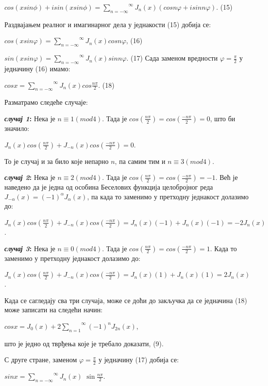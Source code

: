 \(cos(xsin\phi) + isin(xsin\phi) = \overset{\infty}{\sum_{n = - \infty}}J_{n}(x)(cosn\varphi + isinn\varphi)\).
(15)

Раздвајањем реалног и имагинарног дела у једнакости (15) добија се:

\(cos(xsin\varphi) = \overset{\infty}{\sum_{n = - \infty}}J_{n}(x)cosn\varphi\),
(16)

\(sin(xsin\varphi) = \overset{\infty}{\sum_{n = - \infty}}J_{n}(x)sinn\varphi\).
(17) Сада заменом вредности \(\varphi = \frac{\pi}{2}\) у једначину (16)
имамо:

\(cosx = \overset{\infty}{\sum_{n = - \infty}}J_{n}(x)cos\frac{n\pi}{2}\).
(18)

Разматрамо следеће случаје:

\textbf{\emph{случај 1}:} Нека је \(n \equiv 1(mod4)\). Тада је
\(cos(\frac{n\pi}{2}) = cos(\frac{- n\pi}{2}) = 0\), што би значило:

\(J_{n}(x)cos(\frac{n\pi}{2}) + J_{- n}(x)cos(\frac{- n\pi}{2}) = 0\).

То је случај и за било које непарно \(n\), па самим тим и
\(n \equiv 3(mod4)\).

\textbf{\emph{случај 2}:} Нека је \(n \equiv 2(mod4)\). Тада је
\(cos(\frac{n\pi}{2}) = cos(\frac{- n\pi}{2}) = - 1\). Већ је наведено
да је једна од особина Беселових функција целобројног реда
\(J_{- \alpha}(x) = {( - 1)}^{\alpha}J_{\alpha}(x)\), па када то
заменимо у претходну једнакост долазимо до:

\(J_{n}(x)cos(\frac{n\pi}{2}) + J_{- n}(x)cos(\frac{- n\pi}{2}) = J_{n}(x)( - 1) + J_{n}(x)( - 1) = - 2J_{n}(x)\).

\textbf{\emph{случај 3}:} Нека је \(n \equiv 0(mod4)\). Тада је
\(cos(\frac{n\pi}{2}) = cos(\frac{- n\pi}{2}) = 1\). Када то заменимо у
претходну једнакост долазимо до:

\(J_{n}(x)cos(\frac{n\pi}{2}) + J_{- n}(x)cos(\frac{- n\pi}{2}) = J_{n}(x)(1) + J_{n}(x)(1) = 2J_{n}(x)\).

Када се сагледају сва три случаја, може се доћи до закључка да се
једначина (18) може записати на следећи начин:

\(cosx = J_{0}(x) + 2\overset{\infty}{\sum_{n = 1}}{( - 1)}^{n}J_{2n}(x)\),

што је једно од тврђења које је требало доказати, (9).

С друге стране, заменом \(\varphi = \frac{\pi}{2}\) у једначину (17)
добија се:

\(sinx = \overset{\infty}{\sum_{n = - \infty}}J_{n}(x)\)
\(\sin\frac{n\pi}{2}\).

